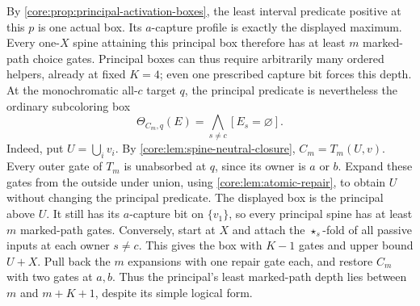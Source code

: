 By \cref{core:prop:principal-activation-boxes}, the least interval
predicate positive at this $p$ is one actual box. Its $a$-capture
profile is exactly the displayed maximum. Every one-$X$ spine attaining
this principal box therefore has at least $m$ marked-path choice gates.
Principal boxes can thus require arbitrarily many ordered helpers,
already at fixed $K=4$; even one prescribed capture bit forces this depth.
At the monochromatic all-$c$ target $q$, the principal predicate is
nevertheless the ordinary subcoloring box
\[
 \Theta_{C_m,q}(E)=\bigwedge_{s\ne c}[E_s=\varnothing].
\]
Indeed, put $U=\bigcup_i v_i$. By
\cref{core:lem:spine-neutral-closure}, $C_m=T_m(U,v)$.
Every outer gate of $T_m$ is unabsorbed at $q$, since its owner
is $a$ or $b$. Expand these gates from the outside under union,
using \cref{core:lem:atomic-repair}, to obtain $U$ without changing
the principal predicate. The displayed box is the principal above $U$.
It still has its $a$-capture bit on $\{v_1\}$, so every principal
spine has at least $m$ marked-path gates. Conversely, start at $X$
and attach the $\star_s$-fold of all passive inputs at each owner
$s\ne c$. This gives the box with $K-1$ gates and upper bound $U+X$.
Pull back the $m$ expansions with one repair gate each, and restore
$C_m$ with two gates at $a,b$. Thus the principal's least marked-path
depth lies between $m$ and $m+K+1$, despite its simple logical form.

